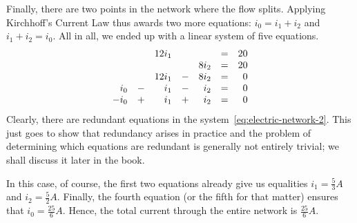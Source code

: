 Finally, there are two points in the network where the flow splits. Applying
Kirchhoff's Current Law thus awards two more equations: $i_0 = i_1 + i_2$ and
$i_1 + i_2 = i_0$. All in all, we ended up with a linear system of five
equations.
\begin{equation}
 \label{eq:electric-network-2}
 \begin{array}{r c r c r c r}
  & & 12i_1 & & & = & 20\\
  & & & & 8i_2 & = & 20\\
  & & 12i_1 & - & 8i_2 & = & 0\\
  i_0 & - & i_1 & - & i_2 & = & 0\\
  -i_0 & + & i_1 & + & i_2 & = & 0
 \end{array}
\end{equation}
Clearly, there are redundant equations in the
system~\eqref{eq:electric-network-2}. This just goes to show that redundancy
arises in practice and the problem of determining which equations are redundant
is generally not entirely trivial; we shall discuss it later in the book.

In this case, of course, the first two equations already give us equalities $i_1
= \frac{5}{3}A$ and $i_2 = \frac{5}{2}A$. Finally, the fourth equation (or the
fifth for that matter) ensures that $i_0 = \frac{25}{6} A$. Hence, the total
current through the entire network is $\frac{25}{6} A$.

